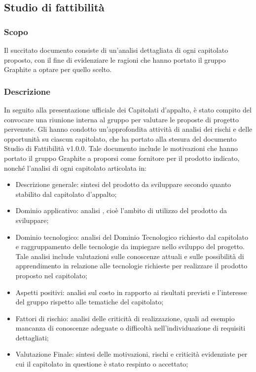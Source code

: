 \documentclass[./../NomeDocumento.tex]{subfiles}
\begin{document}

\subsection{Studio di fattibilità}

\subsubsection{Scopo}

Il succitato documento consiste di un'analisi dettagliata di ogni capitolato proposto, con il fine di evidenziare le ragioni che hanno portato il gruppo Graphite a optare per quello scelto. 

\subsubsection{Descrizione}
In seguito alla presentazione ufficiale dei Capitolati d'appalto, è
stato compito del  convocare una riunione interna al gruppo per valutare le proposte di progetto pervenute. Gli  hanno condotto un'approfondita attività di analisi dei rischi e delle opportunità su ciascun capitolato, che ha portato alla stesura del documento Studio di Fattibilità v1.0.0.
Tale documento include le motivazioni che hanno portato il gruppo Graphite a proporsi come fornitore per il prodotto indicato, nonché l'analisi di ogni capitolato articolata in:

\begin{itemize}
    \item{ Descrizione generale:} sintesi del prodotto da sviluppare secondo quanto stabilito dal capitolato d'appalto;
    
    \item{Dominio applicativo:} analisi , cioè l'ambito di utilizzo del prodotto da sviluppare;
    
    \item{Dominio tecnologico:} analisi del Dominio Tecnologico richiesto dal capitolato e raggruppamento delle tecnologie da impiegare nello sviluppo del progetto. Tale analisi include valutazioni sulle conoscenze attuali e sulle possibilità di apprendimento in relazione alle tecnologie richieste per realizzare il prodotto proposto nel capitolato;
    
    \item{Aspetti positivi:} analisi sul costo in rapporto ai risultati previsti e l’interesse del gruppo rispetto alle tematiche del capitolato;
    
    \item{Fattori di rischio:} analisi delle criticità di realizzazione, quali ad esempio mancanza di conoscenze adeguate o difficoltà nell’individuazione di requisiti dettagliati;
    
    \item{Valutazione Finale:} sintesi delle motivazioni, rischi e criticità evidenziate per cui il capitolato in questione è stato respinto o accettato;
\end{itemize}
\end{document}
